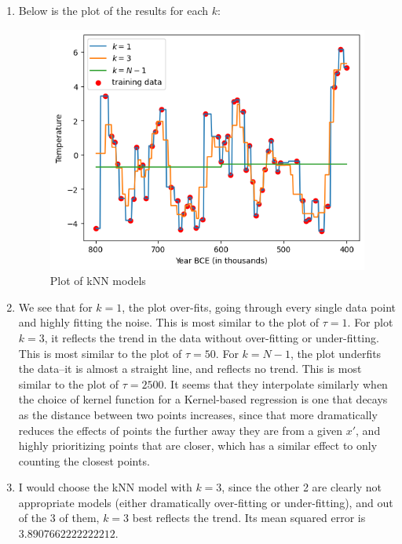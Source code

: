 \documentclass[submit]{harvardml}
\begin{document}
\begin{enumerate}
\item
    Below is the plot of the results for each $k$:
    \begin{figure}[h]
        \centering
        \includegraphics[scale=0.75]{hw1/images/p2.1.png}
        \caption{Plot of kNN models}
        \label{fig:p2.1}
    \end{figure}

\item
    We see that for $k=1$, the plot over-fits, going through every single data point and highly fitting the noise. This is most similar to the plot of $\tau=1$. For plot $k=3$, it reflects the trend in the data without over-fitting or under-fitting. This is most similar to the plot of $\tau=50$. For $k=N-1$, the plot underfits the data--it is almost a straight line, and reflects no trend. This is most similar to the plot of $\tau=2500$. It seems that they interpolate similarly when the choice of kernel function for a Kernel-based regression is one that decays as the distance between two points increases, since that more dramatically reduces the effects of points the further away they are from a given $x'$, and highly prioritizing points that are closer, which has a similar effect to only counting the closest points.

\item
    I would choose the kNN model with $k=3$, since the other 2 are clearly not appropriate models (either dramatically over-fitting or under-fitting), and out of the 3 of them, $k=3$ best reflects the trend. Its mean squared error is $3.8907662222222212$.


\end{enumerate}
\end{document}
